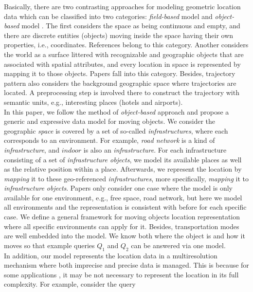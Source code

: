 Basically, there are two contrasting approaches for modeling geometric location data which
can be classified into two categories: \textit{field-based} model and \textit{object-based} 
model \cite{SCGLS97}. The first considers the space as being continuous and empty, and there are discrete entities (objects) moving inside the space having their own properties, i.e., coordinates. 
References \cite{PO+97,WX+98,FG+00,GBE+00} belong to this category. 
Another considers the world as a surface littered with recognizable and geographic objects
that are associated with spatial attributes, and every location in space is represented by
mapping it to those objects. Papers \cite{S02,VD02,BPT04,MR05,GA2006} fall into this category. 
Besides, trajectory pattern \cite{ABKMMV07,SPDMPV08} also considers the background geographic space where trajectories are located. A preprocessing step is involved there to construct the trajectory 
with semantic units, e.g., interesting places (hotels and airports).\\


In this paper, we follow the method of \textit{object-based} approach 
and propose a generic and expressive data model for moving objects. 
We consider the geographic \textit{space} is covered by a set of so-called \textit{infrastructures}, 
where each corresponds to an environment. For example, \textit{road network} is a kind of \textit{infrastructure}, and $indoor$ is also an \textit{infrastructure}. 
For each infrastructure consisting of a set of \textit{infrastructure objects}, we model its available places as well as the relative position within a place. 
Afterwards, we represent the location by \textit{mapping} 
it to these geo-referenced \textit{infrastructures}, more specifically, \textit{mapping} it to \textit{infrastructure objects}. Papers \cite{GBE+00, BPT04,MR05,GA2006} only consider one case where the model is only available for one environment, e.g., free space, road network, but here we model all environments and the representation is consistent with before for each specific case. 
We define a general framework for moving objects location representation where all specific environments can apply for it. Besides, transportation modes are well embedded into the model. We know both where the object is and how it moves so that example queries $Q_1$ and $Q_2$ can be answered via one model. \\


In addition, our model represents the location data in a multiresolution mechanism  
where both imprecise and precise data is managed. This is because for some applications \cite{MR05,MRS05}, it may be not necessary to represent the location in its full complexity. 
For example, consider the query \\

